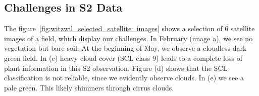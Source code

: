 {		%
	\subsection{Challenges in S2 Data}{
			The figure~\ref{fig:witzwil_selected_satellite_images} shows a selection of 6 satellite images of a field, which display our challenges. In February (image a), we see no vegetation but bare soil. At the beginning of May, we observe a cloudless dark green field. In (c) heavy cloud cover (SCL class 9) leads to a complete loss of plant information in this S2 observation. Figure (d) shows that the SCL classification is not reliable, since we evidently observe clouds. In (e) we see a pale green. This likely shimmers through cirrus clouds. 
			
	}
}

